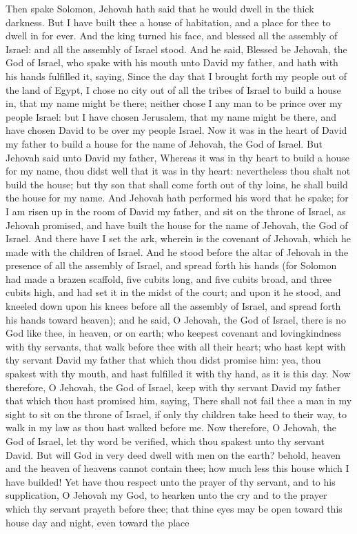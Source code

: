 Then spake Solomon, Jehovah hath said that he would dwell in the thick darkness. But I have built thee a house of habitation, and a place for thee to dwell in for ever. And the king turned his face, and blessed all the assembly of Israel: and all the assembly of Israel stood.  And he said, Blessed be Jehovah, the God of Israel, who spake with his mouth unto David my father, and hath with his hands fulfilled it, saying, Since the day that I brought forth my people out of the land of Egypt, I chose no city out of all the tribes of Israel to build a house in, that my name might be there; neither chose I any man to be prince over my people Israel: but I have chosen Jerusalem, that my name might be there, and have chosen David to be over my people Israel. Now it was in the heart of David my father to build a house for the name of Jehovah, the God of Israel. But Jehovah said unto David my father, Whereas it was in thy heart to build a house for my name, thou didst well that it was in thy heart: nevertheless thou shalt not build the house; but thy son that shall come forth out of thy loins, he shall build the house for my name. And Jehovah hath performed his word that he spake; for I am risen up in the room of David my father, and sit on the throne of Israel, as Jehovah promised, and have built the house for the name of Jehovah, the God of Israel. And there have I set the ark, wherein is the covenant of Jehovah, which he made with the children of Israel.  And he stood before the altar of Jehovah in the presence of all the assembly of Israel, and spread forth his hands (for Solomon had made a brazen scaffold, five cubits long, and five cubits broad, and three cubits high, and had set it in the midst of the court; and upon it he stood, and kneeled down upon his knees before all the assembly of Israel, and spread forth his hands toward heaven); and he said, O Jehovah, the God of Israel, there is no God like thee, in heaven, or on earth; who keepest covenant and lovingkindness with thy servants, that walk before thee with all their heart; who hast kept with thy servant David my father that which thou didst promise him: yea, thou spakest with thy mouth, and hast fulfilled it with thy hand, as it is this day. Now therefore, O Jehovah, the God of Israel, keep with thy servant David my father that which thou hast promised him, saying, There shall not fail thee a man in my sight to sit on the throne of Israel, if only thy children take heed to their way, to walk in my law as thou hast walked before me. Now therefore, O Jehovah, the God of Israel, let thy word be verified, which thou spakest unto thy servant David.  But will God in very deed dwell with men on the earth? behold, heaven and the heaven of heavens cannot contain thee; how much less this house which I have builded! Yet have thou respect unto the prayer of thy servant, and to his supplication, O Jehovah my God, to hearken unto the cry and to the prayer which thy servant prayeth before thee; that thine eyes may be open toward this house day and night, even toward the place 